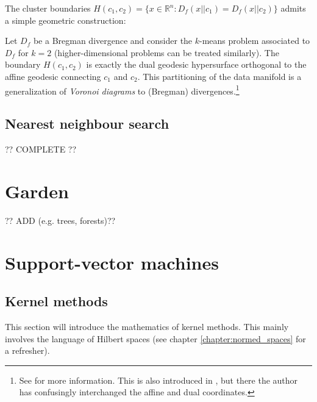     The cluster boundaries $H(c_1, c_2)=\{x\in\mathbb{R}^n:D_f(x||c_1)=D_f(x||c_2)\}$ admits a simple geometric construction:
    \begin{property}
        Let $D_f$ be a Bregman divergence and consider the $k$-means problem associated to $D_f$ for $k=2$ (higher-dimensional problems can be treated similarly). The boundary $H(c_1, c_2)$ is exactly the dual geodesic hypersurface orthogonal to the affine geodesic connecting $c_1$ and $c_2$. This partitioning of the data manifold is a generalization of \textit{Voronoi diagrams} to (Bregman) divergences.\footnote{See \cite{voronoi_bregman} for more information. This is also introduced in \cite{amari}, but there the author has confusingly interchanged the affine and dual coordinates.}
    \end{property}

\subsection{Nearest neighbour search}

    ?? COMPLETE ??

\section{Garden}

    ?? ADD (e.g. trees, forests)??

\section{Support-vector machines}
\subsection{Kernel methods}

    This section will introduce the mathematics of kernel methods. This mainly involves the language of Hilbert spaces (see chapter \ref{chapter:normed_spaces} for a refresher).

